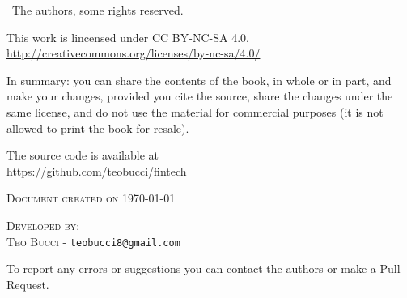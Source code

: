 
\textcopyright \ The authors, some rights reserved.

This work is lincensed under CC BY-NC-SA 4.0.\\
\url{http://creativecommons.org/licenses/by-nc-sa/4.0/}

In summary: you can share the contents of the book, in whole or in part, and make your changes, provided you cite the source, share the changes under the same license, and do not use the material for commercial purposes (it is not allowed to print the book for resale).

The \latex source code is available at\\
\url{https://github.com/teobucci/fintech}


\textsc{Document created on \today}


\textsc{Developed by:}\\
\textsc{Teo Bucci} - \texttt{teobucci8@gmail.com}

To report any errors or suggestions you can contact the authors or make a Pull Request.

